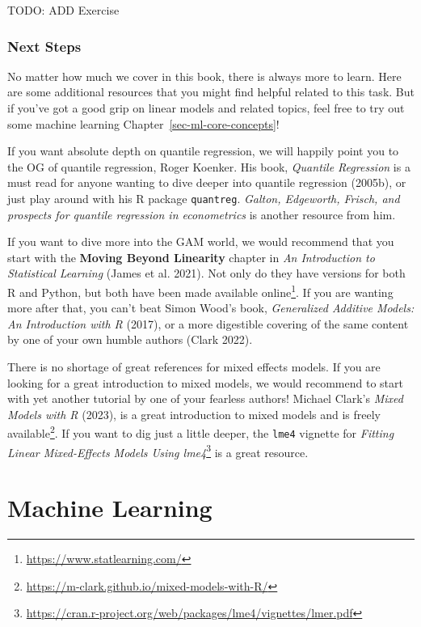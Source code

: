 \documentclass[
  letterpaper,
]{krantz}
\DeclareRobustCommand{\href}[2]{#2\footnote{\url{#1}}}
\begin{document}
TODO: ADD Exercise

\section{Next Steps}\label{sec-lm-extend-next-steps}

No matter how much we cover in this book, there is always more to learn.
Here are some additional resources that you might find helpful related
to this task. But if you've got a good grip on linear models and related
topics, feel free to try out some machine learning
Chapter~\ref{sec-ml-core-concepts}!

If you want absolute depth on quantile regression, we will happily point
you to the OG of quantile regression, Roger Koenker. His book,
\emph{Quantile Regression} is a must read for anyone wanting to dive
deeper into quantile regression (2005b), or just play around with his R
package \texttt{quantreg}. \emph{Galton, Edgeworth, Frisch, and
prospects for quantile regression in econometrics} is another resource
from him.

If you want to dive more into the GAM world, we would recommend that you
start with the \textbf{Moving Beyond Linearity} chapter in \emph{An
Introduction to Statistical Learning} (James et al. 2021). Not only do
they have versions for both R and Python, but both have been made
\href{https://www.statlearning.com/}{available online}. If you are
wanting more after that, you can't beat Simon Wood's book,
\emph{Generalized Additive Models: An Introduction with R} (2017), or a
more digestible covering of the same content by one of your own humble
authors (Clark 2022).

There is no shortage of great references for mixed effects models. If
you are looking for a great introduction to mixed models, we would
recommend to start with yet another tutorial by one of your fearless
authors! Michael Clark's \emph{Mixed Models with R} (2023), is a great
introduction to mixed models and is
\href{https://m-clark.github.io/mixed-models-with-R/}{freely available}.
If you want to dig just a little deeper, the \texttt{lme4} vignette for
\href{https://cran.r-project.org/web/packages/lme4/vignettes/lmer.pdf}{\emph{Fitting
Linear Mixed-Effects Models Using lme4}} is a great resource.

\part{Machine Learning}
\end{document}
